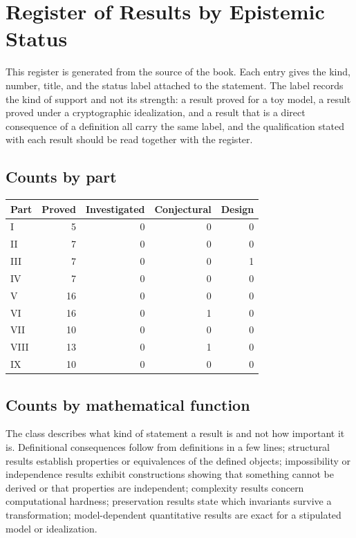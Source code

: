 \documentclass[11pt,twoside,openright]{book}
\theoremstyle{plain}
\theoremstyle{definition}
\theoremstyle{remark}
\begin{document}
\chapter{Register of Results by Epistemic Status}\label{app:register}

This register is generated from the source of the book. Each entry gives the kind, number, title, and the status label attached to the statement. The label records the kind of support and not its strength: a result proved for a toy model, a result proved under a cryptographic idealization, and a result that is a direct consequence of a definition all carry the same label, and the qualification stated with each result should be read together with the register.

\section*{Counts by part}
\begin{tabular}{lrrrr}
\toprule
Part & Proved & Investigated & Conjectural & Design \\
\midrule
I & 5 & 0 & 0 & 0 \\
II & 7 & 0 & 0 & 0 \\
III & 7 & 0 & 0 & 1 \\
IV & 7 & 0 & 0 & 0 \\
V & 16 & 0 & 0 & 0 \\
VI & 16 & 0 & 1 & 0 \\
VII & 10 & 0 & 0 & 0 \\
VIII & 13 & 0 & 1 & 0 \\
IX & 10 & 0 & 0 & 0 \\
\bottomrule
\end{tabular}

\section*{Counts by mathematical function}
The class describes what kind of statement a result is and not how important it is. Definitional consequences follow from definitions in a few lines; structural results establish properties or equivalences of the defined objects; impossibility or independence results exhibit constructions showing that something cannot be derived or that properties are independent; complexity results concern computational hardness; preservation results state which invariants survive a transformation; model-dependent quantitative results are exact for a stipulated model or idealization.
\end{document}
